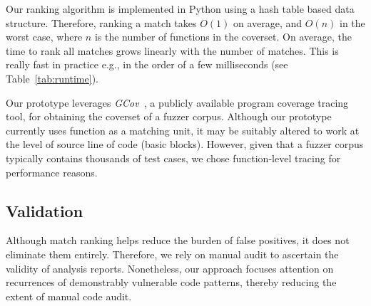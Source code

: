 Our ranking algorithm is implemented in Python using a hash table based data structure.
Therefore, ranking a match takes $O(1)$ on average, and $O(n)$ in the worst case, where $n$ is the number of functions in the coverset.
On average, the time to rank all matches grows linearly with the number of matches.
This is really fast in practice e.g., in the order of a few milliseconds (see Table~\ref{tab:runtime}).

Our prototype leverages {\it GCov}~\cite{gcov}, a publicly available program coverage tracing tool, for obtaining the coverset of a fuzzer corpus.
Although our prototype currently uses function as a matching unit, it may be suitably altered to work at the level of source line of code (basic blocks).
However, given that a fuzzer corpus typically contains thousands of test cases, we chose function-level tracing for performance reasons.

\subsection{Validation}
\label{sec:validate}


Although match ranking helps reduce the burden of false positives, it does not eliminate them entirely.
Therefore, we rely on manual audit to ascertain the validity of analysis reports.
Nonetheless, our approach focuses attention on recurrences of demonstrably vulnerable code patterns, thereby reducing the extent of manual code audit.
